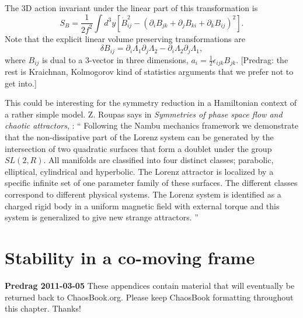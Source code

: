 \begin{description}
The 3D action invariant under the linear part of this transformation is
\begin{equation}
S_B = \frac{1}{2 f^2}  \int d^3y [  \dot{B}_{ij}^2 - (\partial_i B_{jk} +\partial_j B_{ki} +\partial_k B_{ij})^2].
\end{equation}
Note that the explicit linear volume preserving transformations are
\begin{equation}
\delta B_{ij} = \partial_i \Lambda_1 \partial_j \Lambda_2 - \partial_i \Lambda_2
\partial_j \Lambda_1,
\end{equation}
where $B_{ij}$  is dual to a 3-vector in three dimensions,
$
a_i = \frac{1}{2} \epsilon_{ijk} B_{jk}
$.
[Predrag: the rest is Kraichnan, Kolmogorov kind of statistics arguments that
we prefer not to get into.]

\item[Christel 2011-10-05 ] This could be interesting for the symmetry
reduction in a Hamiltonian context of a rather simple model.
Z. Roupas says in
\emph{Symmetries of phase space flow and chaotic attractors},
 : ``
Following the Nambu mechanics framework we demonstrate that the
non-dissipative part of the Lorenz system can be generated by the
intersection of two quadratic surfaces that form a doublet under the
group $SL(2,R)$. All manifolds are classified into four distinct classes;
parabolic, elliptical, cylindrical and hyperbolic. The Lorenz attractor
is localized by a specific infinite set of one parameter family of these
surfaces. The different classes correspond to different physical systems.
The Lorenz system is identified as a charged rigid body in a uniform
magnetic field with external torque and this system is generalized to
give new strange attractors.
''


\end{description}

\newpage
\section{Stability in a co-moving frame}
\label{sect:stabComoving}

{\bf Predrag 2011-03-05}
{These appendices contain material that will eventually be returned back to
    ChaosBook.org. Please keep ChaosBook formatting throughout this chapter.
    Thanks!}

